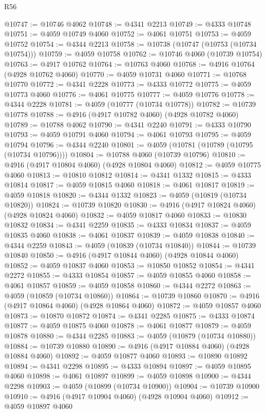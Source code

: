 \begin{lexlean}{R56}
\begin{coremodule}
@10747 := @10746 @4062
@10748 := @4341 @2213
@10749 := @4333 @10748
@10751 := @4059 @10749 @4060
@10752 := @4061 @10751
@10753 := @4059 @10752
@10754 := @4344 @2213
@10758 := @10738 (@10747 (@10753 (@10734 @10754)))
@10759 := @4059 @10758
@10762 := @10746 @4060 (@10739 @10754)
@10763 := @4917 @10762
@10764 := @10763 @4060
@10768 := @4916 @10764 (@4928 @10762 @4060)
@10770 := @4059 @10731 @4060
@10771 := @10768 @10770
@10772 := @4341 @2228
@10773 := @4333 @10772
@10775 := @4059 @10773 @4060
@10776 := @4061 @10775
@10777 := @4059 @10776
@10778 := @4344 @2228
@10781 := @4059 (@10777 (@10734 @10778))
@10782 := @10739 @10778
@10788 := @4916 (@4917 @10782 @4060) (@4928 @10782 @4060)
@10789 := @10788 @4062
@10790 := @4341 @2240
@10791 := @4333 @10790
@10793 := @4059 @10791 @4060
@10794 := @4061 @10793
@10795 := @4059 @10794
@10796 := @4344 @2240
@10801 := @4059 (@10781 (@10789 (@10795 (@10734 @10796))))
@10804 := @10788 @4060 (@10739 @10796)
@10810 := @4916 (@4917 @10804 @4060) (@4928 @10804 @4060)
@10812 := @4059 @10775 @4060
@10813 := @10810 @10812
@10814 := @4341 @1332
@10815 := @4333 @10814
@10817 := @4059 @10815 @4060
@10818 := @4061 @10817
@10819 := @4059 @10818
@10820 := @4344 @1332
@10823 := @4059 (@10819 (@10734 @10820))
@10824 := @10739 @10820
@10830 := @4916 (@4917 @10824 @4060) (@4928 @10824 @4060)
@10832 := @4059 @10817 @4060
@10833 := @10830 @10832
@10834 := @4341 @2259
@10835 := @4333 @10834
@10837 := @4059 @10835 @4060
@10838 := @4061 @10837
@10839 := @4059 @10838
@10840 := @4344 @2259
@10843 := @4059 (@10839 (@10734 @10840))
@10844 := @10739 @10840
@10850 := @4916 (@4917 @10844 @4060) (@4928 @10844 @4060)
@10852 := @4059 @10837 @4060
@10853 := @10850 @10852
@10854 := @4341 @2272
@10855 := @4333 @10854
@10857 := @4059 @10855 @4060
@10858 := @4061 @10857
@10859 := @4059 @10858
@10860 := @4344 @2272
@10863 := @4059 (@10859 (@10734 @10860))
@10864 := @10739 @10860
@10870 := @4916 (@4917 @10864 @4060) (@4928 @10864 @4060)
@10872 := @4059 @10857 @4060
@10873 := @10870 @10872
@10874 := @4341 @2285
@10875 := @4333 @10874
@10877 := @4059 @10875 @4060
@10878 := @4061 @10877
@10879 := @4059 @10878
@10880 := @4344 @2285
@10883 := @4059 (@10879 (@10734 @10880))
@10884 := @10739 @10880
@10890 := @4916 (@4917 @10884 @4060) (@4928 @10884 @4060)
@10892 := @4059 @10877 @4060
@10893 := @10890 @10892
@10894 := @4341 @2298
@10895 := @4333 @10894
@10897 := @4059 @10895 @4060
@10898 := @4061 @10897
@10899 := @4059 @10898
@10900 := @4344 @2298
@10903 := @4059 (@10899 (@10734 @10900))
@10904 := @10739 @10900
@10910 := @4916 (@4917 @10904 @4060) (@4928 @10904 @4060)
@10912 := @4059 @10897 @4060

\end{coremodule}
\end{lexlean}

